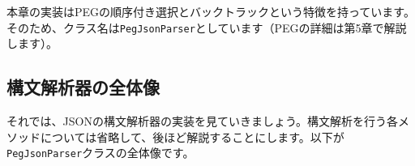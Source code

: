 本章の実装はPEGの順序付き選択とバックトラックという特徴を持っています。そのため、クラス名は\texttt{PegJsonParser}としています（PEGの詳細は第5章で解説します）。

\hypertarget{chapter3-ux69cbux6587ux89e3ux6790ux5668ux306eux5168ux4f53ux50cf}{%
\subsection{構文解析器の全体像}\label{chapter3-ux69cbux6587ux89e3ux6790ux5668ux306eux5168ux4f53ux50cf}}

それでは、JSONの構文解析器の実装を見ていきましょう。構文解析を行う各メソッドについては省略して、後ほど解説することにします。以下が\texttt{PegJsonParser}クラスの全体像です。

\begin{Shaded}
\begin{Highlighting}[]


 
     
     

         \NormalTok{ \{}
         \NormalTok{(}
\NormalTok{        \}}
\NormalTok{    \}}

    \NormalTok{\textgreater{} }\NormalTok{(}
        \NormalTok{ = }\NormalTok{;}
\NormalTok{();}
         \NormalTok{(}\NormalTok{));}
\NormalTok{    \}}


\end{Highlighting}
\end{Shaded}
